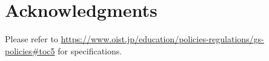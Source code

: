 \chapter*{Acknowledgments}

Please refer to \url{https://www.oist.jp/education/policies-regulations/gs-policies#toc5} for specifications.
